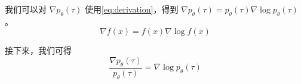 
我们可以对 $\nabla p_{\theta}(\tau)$ 使用\eqref{eq:derivation}，得到 $\nabla p_{\theta}(\tau)=p_{\theta}(\tau)  \nabla \log p_{\theta}(\tau)$。
\begin{equation}
    \label{eq:derivation}
    \nabla f(x)=f(x)\nabla \log f(x)
\end{equation}

接下来，我们可得
\begin{equation}
    \label{eq:}
    \frac{\nabla p_{\theta}(\tau)}{p_{\theta}(\tau)}= \nabla \log p_{\theta}(\tau)
\end{equation}


